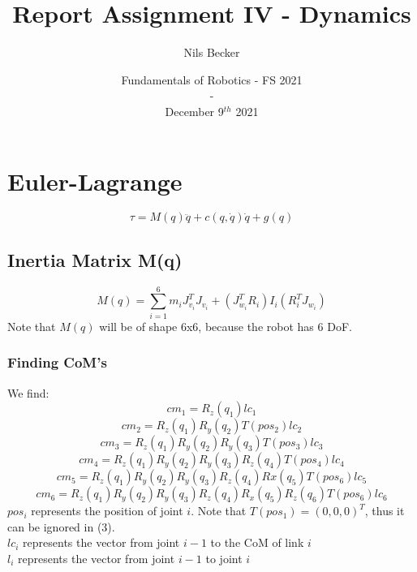 \documentclass{article}
\title{Report Assignment IV - Dynamics}
\date{Fundamentals of Robotics - FS 2021\\-\\December 9$^{th}$ 2021}
\author{Nils Becker}
\begin{document}
  \maketitle
  \newpage
  \section{Euler-Lagrange}
	\begin{equation}
	\tau = M(q)\ddot{q}+c(q,\dot{q})\dot{q}+g(q)
	\end{equation}
	\subsection{Inertia Matrix M(q)}
	\begin{equation}
	M(q) = \sum^6_{i=1}m_iJ_{v_i}^TJ_{v_i}+(J_{w_i}^TR_i)I_i(R_i^TJ_{w_i})
	\end{equation}
	Note that $M(q)$ will be of shape 6x6, because the robot has 6 DoF.
  \subsubsection{Finding CoM's}

  We find:
  \begin{equation}
  cm_1=R_z(q_1)lc_1
  \end{equation}
  \begin{equation}
  cm_2=R_z(q_1)R_y(q_2)T(pos_2)lc_2  
  \end{equation}
  \begin{equation}
  cm_3=R_z(q_1)R_y(q_2)R_y(q_3)T(pos_3)lc_3
  \end{equation}
  \begin{equation}
  cm_4=R_z(q_1)R_y(q_2)R_y(q_3)R_z(q_4)T(pos_4)lc_4
  \end{equation}
  \begin{equation}
  cm_5=R_z(q_1)R_y(q_2)R_y(q_3)R_z(q_4)Rx(q_5)T(pos_6)lc_5
  \end{equation}\begin{equation}
  cm_6=R_z(q_1)R_y(q_2)R_y(q_3)R_z(q_4)R_x(q_5)R_z(q_6)T(pos_6)lc_6
  \end{equation}
  $pos_i$ represents the position of joint $i$. Note that $T(pos_1)=(0,0,0)^T$, thus it can be ignored in (3). \\
  $lc_i$ represents the vector from joint $i-1$ to the CoM of link $i$\\
  $l_i$ represents the vector from joint $i-1$ to joint $i$
\end{document}
